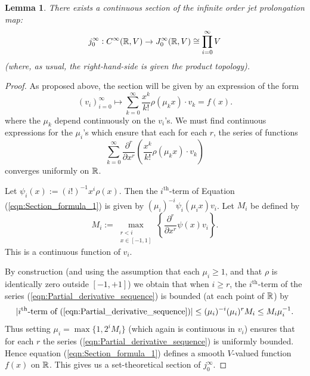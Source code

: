 \documentclass{article}
\newtheorem{lemma}[theorem]{Lemma}
\newtheorem{proposed work}[theorem]{Proposed Work}
\theoremstyle{definition}
\begin{document}
\begin{lemma}
	There exists a continuous section of the infinite order jet prolongation map:
	\begin{equation*}
		j^\infty_0: C^\infty(\mathbb R, V) \to J_0^\infty(\mathbb R, V) \cong \prod_{i=0}^\infty V
	\end{equation*}
	(where, as usual, the right-hand-side is given the product topology).
\end{lemma}

\begin{proof}
	As proposed above, the section will be given by an expression of the form
	\begin{equation} \label{eqn:Section_formula_1}
		(v_i)_{i=0}^\infty \mapsto \sum_{k=0}^\infty \frac{x^k}{k!} \rho(\mu_k x) \cdot v_k = f(x).
	\end{equation}
	where the $\mu_k$ depend continuously on the $v_i$'s. 
	We must find continuous expressions for the $\mu_i$'s which ensure that each for each $r$, the series of functions
	\begin{equation} \label{eqn:Partial_derivative_sequence}
		\sum_{k=0}^\infty \frac{\partial^r}{\partial x^r} \left( \frac{x^k}{k!} \rho(\mu_k x) \cdot v_k \right)
	\end{equation}
	converges uniformly on $\mathbb R$. 
	
	Let $\psi_i(x) := (i!)^{-1} x^i \rho(x)$. Then the $i^\textrm{th}$-term of Equation (\ref{eqn:Section_formula_1}) is given by $(\mu_i)^{-i} \psi_i(\mu_ix) v_i$. Let $M_i$ be defined by
	\begin{equation*}
		M_i := \max_{\substack{r < i \\ x \in [-1,1]}} \left\{ \frac{\partial^r}{\partial x^r} \psi(x) v_i \right\}.
	\end{equation*}
	This is a continuous function of $v_i$. 
	
	By construction (and using the assumption that each $\mu_i \geq 1$, and that $\rho$ is identically zero outside $[-1,+1]$) we obtain that when $i \geq r$, the $i^\textrm{th}$-term of the series (\ref{eqn:Partial_derivative_sequence}) is bounded (at each point of $\mathbb R$) by 
	\begin{equation*}
		|i^\textrm{th}\textrm{-term of (\ref{eqn:Partial_derivative_sequence})}| \leq (\mu_i)^{-i} (\mu_i)^r M_i \leq M_i \mu_i^{-1}. 
	\end{equation*}
	Thus setting $\mu_i = \max \{1, 2^i M_i \}$ (which again is continuous in $v_i$) ensures that for each $r$ the series (\ref{eqn:Partial_derivative_sequence}) is uniformly bounded. Hence equation (\ref{eqn:Section_formula_1}) defines a smooth $V$-valued function $f(x)$ on $\mathbb R$. This gives us a set-theoretical section of $j^\infty_0$. 
	

\end{proof}
\end{document}
